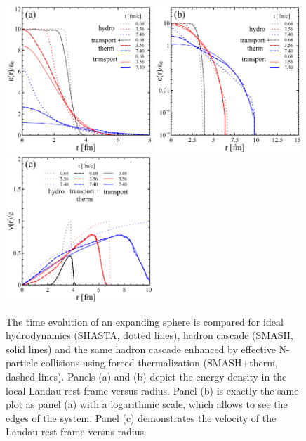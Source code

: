 \begin{figure}
  \centering
  \includegraphics[width=0.49\textwidth]{plots/forced_thermalization/sphere_e_lin.pdf}
  \includegraphics[width=0.49\textwidth]{plots/forced_thermalization/sphere_e_log.pdf} \\
  \includegraphics[width=0.49\textwidth]{plots/forced_thermalization/sphere_v.pdf}
  \caption{The time evolution of an expanding sphere is compared for ideal
           hydrodynamics (SHASTA, dotted lines), hadron cascade (SMASH, solid lines)
           and
           the same hadron cascade enhanced by effective N-particle collisions using
           forced thermalization (SMASH+therm, dashed lines). Panels (a) and (b) depict
           the energy density in the local Landau rest frame versus radius. Panel (b)
           is
           exactly the same plot as panel (a) with a logarithmic scale, which allows to
           see the edges of the system. Panel (c) demonstrates the velocity of the
           Landau
           rest frame versus radius. }
    \label{Fig:sphere}
\end{figure}



